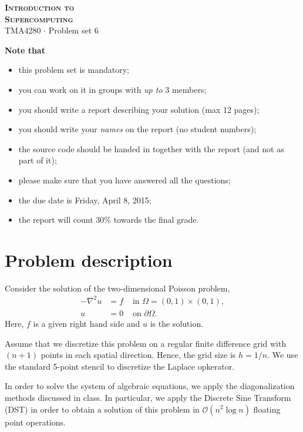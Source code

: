 \documentclass[onecolumn, oneside, a4paper, 11pt]{memoir}
\theoremstyle{remark}
\begin{document}
\pagestyle{empty}

\begin{center}
  {\Huge \bfseries \scshape
    Introduction to \\[0.2\baselineskip] Supercomputing} \\[2\baselineskip]
  {\Large TMA4280 $\cdot$ Problem set 6} \\[2\baselineskip]
\end{center}

\textbf{Note that}
\begin{itemize}
\item this problem set is mandatory;
\item you can work on it in groups with \emph{up to} 3 members;
\item you should write a report describing your solution (max 12 pages);
\item you should write your \emph{names} on the report (no student numbers);
\item the source code should be handed in together with the report (and not as
  part of it);
\item please make sure that you have answered all the questions;
\item the due date is Friday, April 8, 2015;
\item the report will count 30\% towards the final grade.
\end{itemize}


\section{Problem description}

Consider the solution of the two-dimensional Poisson problem,
\begin{align*}
  -\nabla^2 u &= f & \text{ in } \Omega = (0,1) \times (0,1), \\
  u &= 0 & \text{ on } \partial\Omega.
\end{align*}
Here, $f$ is a given right hand side and $u$ is the solution.

Assume that we discretize this problem on a regular finite difference grid with
$(n+1)$ points in each spatial direction. Hence, the grid size is $h=1/n$. We
use the standard 5-point stencil to discretize the Laplace opkerator.

In order to solve the system of algebraic equations, we apply the
diagonalization methods discussed in class. In particular, we apply the Discrete
Sine Transform (DST) in order to obtain a solution of this problem in
$\mathcal{O}(n^2\log n)$ floating point operations.
\end{document}
